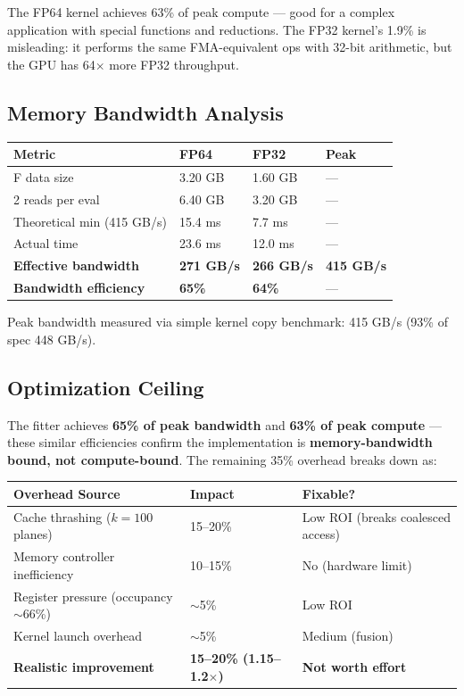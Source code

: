 \documentclass[11pt,a4paper]{article}
\begin{document}
The FP64 kernel achieves 63\% of peak compute — good for a complex application with special functions and reductions. The FP32 kernel's 1.9\% is misleading: it performs the same FMA-equivalent ops with 32-bit arithmetic, but the GPU has 64$\times$ more FP32 throughput.

\subsection{Memory Bandwidth Analysis}

\begin{center}
\begin{tabular}{@{}llll@{}}
\toprule
\textbf{Metric} & \textbf{FP64} & \textbf{FP32} & \textbf{Peak} \\ \midrule
F data size & 3.20 GB & 1.60 GB & --- \\
2 reads per eval & 6.40 GB & 3.20 GB & --- \\
Theoretical min (415 GB/s) & 15.4 ms & 7.7 ms & --- \\
Actual time & 23.6 ms & 12.0 ms & --- \\
\textbf{Effective bandwidth} & \textbf{271 GB/s} & \textbf{266 GB/s} & \textbf{415 GB/s} \\
\textbf{Bandwidth efficiency} & \textbf{65\%} & \textbf{64\%} & --- \\ \bottomrule
\end{tabular}
\end{center}

Peak bandwidth measured via simple kernel copy benchmark: 415 GB/s (93\% of spec 448 GB/s).

\subsection{Optimization Ceiling}

The fitter achieves \textbf{65\% of peak bandwidth} and \textbf{63\% of peak compute} — these similar efficiencies confirm the implementation is \textbf{memory-bandwidth bound, not compute-bound}. The remaining 35\% overhead breaks down as:

\begin{center}
\begin{tabular}{@{}lll@{}}
\toprule
\textbf{Overhead Source} & \textbf{Impact} & \textbf{Fixable?} \\ \midrule
Cache thrashing ($k=100$ planes) & 15--20\% & Low ROI (breaks coalesced access) \\
Memory controller inefficiency & 10--15\% & No (hardware limit) \\
Register pressure (occupancy $\sim$66\%) & $\sim$5\% & Low ROI \\
Kernel launch overhead & $\sim$5\% & Medium (fusion) \\ \midrule
\textbf{Realistic improvement} & \textbf{15--20\% (1.15--1.2$\times$)} & \textbf{Not worth effort} \\ \bottomrule
\end{tabular}
\end{center}
\end{document}
